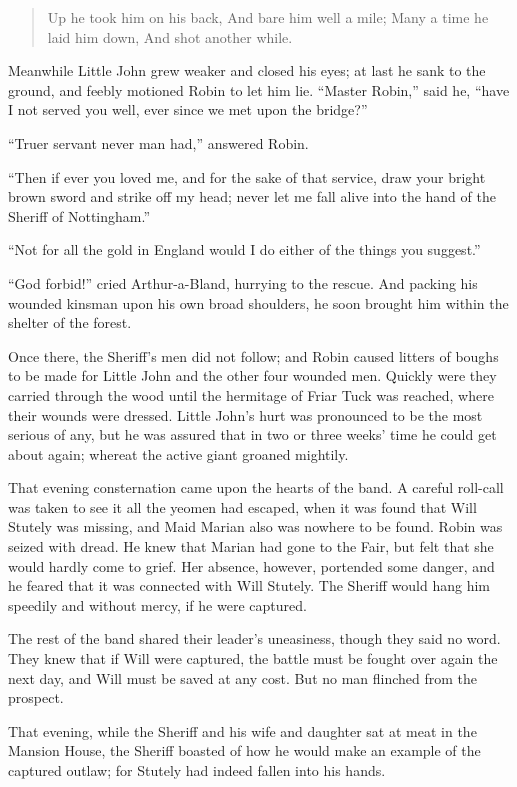 \begin{quote}
Up he took him on his back,
And bare him well a mile;
Many a time he laid him down,
And shot another while.
\end{quote}

Meanwhile Little John grew weaker and closed his eyes; at last he sank
to the ground, and feebly motioned Robin to let him lie. ``Master
Robin,'' said he, ``have I not served you well, ever since we met upon
the bridge?''

``Truer servant never man had,'' answered Robin.

``Then if ever you loved me, and for the sake of that service, draw your
bright brown sword and strike off my head; never let me fall alive into
the hand of the Sheriff of Nottingham.''

``Not for all the gold in England would I do either of the things you
suggest.''

``God forbid!'' cried Arthur-a-Bland, hurrying to the rescue. And
packing his wounded kinsman upon his own broad shoulders, he soon
brought him within the shelter of the forest.

Once there, the Sheriff's men did not follow; and Robin caused litters
of boughs to be made for Little John and the other four wounded men.
Quickly were they carried through the wood until the hermitage of Friar
Tuck was reached, where their wounds were dressed. Little John's hurt
was pronounced to be the most serious of any, but he was assured that in
two or three weeks' time he could get about again; whereat the active
giant groaned mightily.

That evening consternation came upon the hearts of the band. A careful
roll-call was taken to see it all the yeomen had escaped, when it was
found that Will Stutely was missing, and Maid Marian also was nowhere to
be found. Robin was seized with dread. He knew that Marian had gone to
the Fair, but felt that she would hardly come to grief. Her absence,
however, portended some danger, and he feared that it was connected with
Will Stutely. The Sheriff would hang him speedily and without mercy, if
he were captured.

The rest of the band shared their leader's uneasiness, though they said
no word. They knew that if Will were captured, the battle must be fought
over again the next day, and Will must be saved at any cost. But no man
flinched from the prospect.

That evening, while the Sheriff and his wife and daughter sat at meat in
the Mansion House, the Sheriff boasted of how he would make an example
of the captured outlaw; for Stutely had indeed fallen into his hands.

